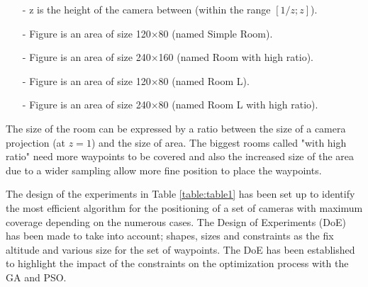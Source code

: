 \begin{itemize}
\item[-]    z is the height of the camera between (within the range $[1/z;z]$).
\item[-]	Figure  is an area of size 120$\times$80  (named  Simple Room). 
\item[-]	Figure  is an area of size 240$\times$160 (named Room with high ratio).
\item[-]	Figure  is an area of size 120$\times$80  (named Room L).
\item[-]	Figure  is an area of size 240$\times$80  (named Room L with high ratio).
\end{itemize}

The size of the room can be expressed by a ratio between the size of a camera projection (at $z=1$) and the size of area. The biggest rooms called "with high ratio" need more waypoints to be covered and also the increased size of the area  due to a wider sampling allow more fine position to place the waypoints.

The design of the experiments in Table \ref{table:table1} has been set up to identify the most efficient algorithm for the positioning of a set of cameras with maximum coverage depending on the numerous cases. 
The Design of Experiments (DoE) has been made to take into account; shapes, sizes and constraints as the fix altitude and various size for the set of waypoints. The DoE has been established to highlight the impact of the constraints on the optimization process with the GA and PSO.


